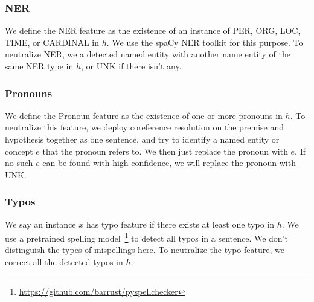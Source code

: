 \subsubsection{NER}
We define the NER feature as the existence of an instance of
PER, ORG, LOC, TIME, or CARDINAL in $h$.
We use the spaCy NER toolkit for this purpose. 
To neutralize NER, we a detected named entity with another
name entity of the same NER type in $h$, or UNK if there isn't any. 

\subsubsection{Pronouns}
We define the Pronoun feature as the existence of one or more pronouns
in $h$. To neutralize this feature, we deploy coreference resolution
on the premise and hypothesis together as one sentence, and try to identify
a named entity or concept $e$ that the pronoun refers to. 
We then just replace the pronoun with $e$. If no such $e$ can be found
with high confidence, we will replace the pronoun with UNK.
 
\subsubsection{Typos}
We say an instance $x$ has typo feature if there exists at least one
typo in $h$.
We use a pretrained spelling model~\footnote{\url{https://github.com/barrust/pyspellchecker}} 
to detect all typos in a sentence. We don't distinguish the types of mispellings here. 
To neutralize the typo feature, we correct all the detected typos in $h$.


